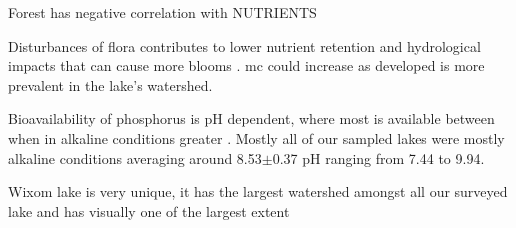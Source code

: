 Forest has negative correlation with NUTRIENTS

Disturbances of flora contributes to lower nutrient retention and hydrological impacts that can cause more blooms \cite{anderson_harmful_2002, codd_cyanobacterial_2000, fraterrigo_influence_2008}.
\gls{mc} could increase as developed is more prevalent in the lake's watershed.


Bioavailability of phosphorus is pH dependent, where most is available between when in alkaline conditions greater \cite{lucas_relationships_1961}.
Mostly all of our sampled lakes were mostly alkaline conditions averaging around 8.53$\pm$0.37 pH ranging from 7.44 to 9.94.

Wixom lake is very unique, it has the largest watershed amongst all our surveyed lake and has visually one of the largest extent
















